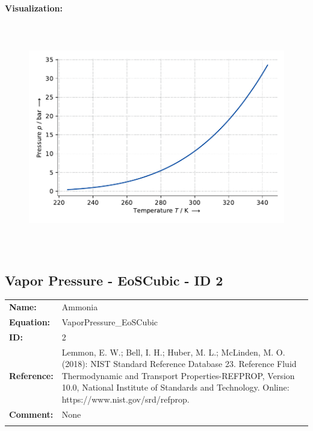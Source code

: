 \textbf{Visualization:}
%
\begin{figure}[!htp]
{\noindent\includegraphics[height=10cm, keepaspectratio]{figs/ref/ref_Ammonia_VaporPressure_EoSCubic_1.pdf}}
\end{figure}
%

\FloatBarrier
\newpage
\subsection{Vapor Pressure - EoSCubic - ID 2}
%
\begin{tabular}[l]{|lp{11.5cm}|}
\hline
\addlinespace

\textbf{Name:} & Ammonia \\
\textbf{Equation:} & VaporPressure\_EoSCubic \\
\textbf{ID:} & 2 \\
\textbf{Reference:} & Lemmon, E. W.; Bell, I. H.; Huber, M. L.; McLinden, M. O. (2018): NIST Standard Reference Database 23. Reference Fluid Thermodynamic and Transport Properties-REFPROP, Version 10.0, National Institute of Standards and Technology. Online: https://www.nist.gov/srd/refprop. \\
\textbf{Comment:} & None \\

\addlinespace
\hline
\end{tabular}
\newline

